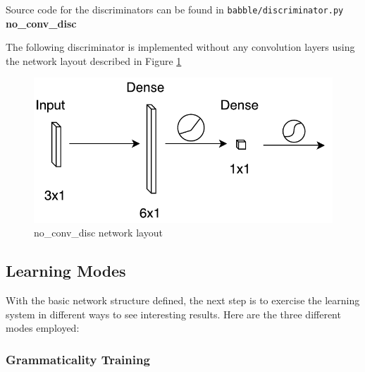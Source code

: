 \documentclass[11pt]{article}
\begin{document}
Source code for the discriminators can be found in \texttt{babble/discriminator.py} \\

\noindent \textbf{no\_conv\_disc}

The following discriminator is implemented without any convolution layers using the network layout described in Figure \ref{fig:no_conv_disc}

\begin{figure}[ht]
    \centering
    \includegraphics{no_conv_disc.pdf}
    \caption{no\_conv\_disc network layout}
    \label{fig:no_conv_disc}
\end{figure}

\subsection{Learning Modes}

With the basic network structure defined, the next step is to exercise the learning system in different ways to see interesting results. Here are the three different modes employed:

\subsubsection{Grammaticality Training}
\end{document}
